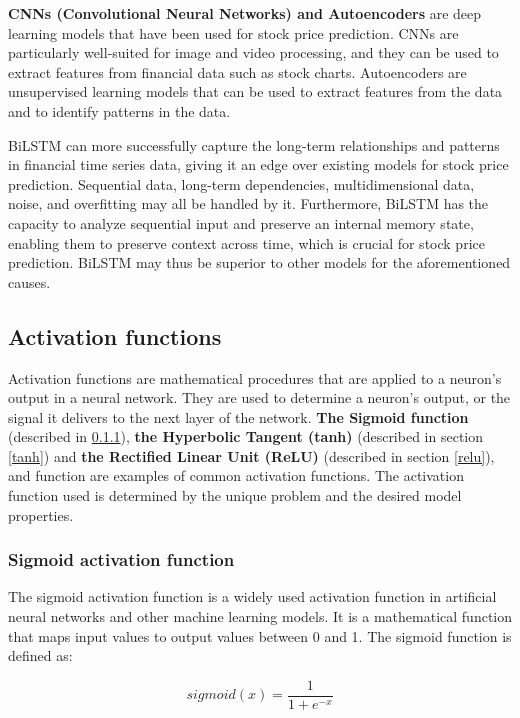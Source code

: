 \documentclass[a4paper]{article}
\begin{document}
\textbf{CNNs (Convolutional Neural Networks) and Autoencoders} are deep learning models that have been used for stock price prediction. CNNs are particularly well-suited for image and video processing, and they can be used to extract features from financial data such as stock charts. Autoencoders are unsupervised learning models that can be used to extract features from the data and to identify patterns in the data.

BiLSTM can more successfully capture the long-term relationships and patterns in financial time series data, giving it an edge over existing models for stock price prediction. Sequential data, long-term dependencies, multidimensional data, noise, and overfitting may all be handled by it. Furthermore, BiLSTM has the capacity to analyze sequential input and preserve an internal memory state, enabling them to preserve context across time, which is crucial for stock price prediction. BiLSTM may thus be superior to other models for the aforementioned causes.
\subsection{Activation functions}

Activation functions are mathematical procedures that are applied to a neuron's output in a neural network. They are used to determine a neuron's output, or the signal it delivers to the next layer of the network. \textbf{The Sigmoid function} (described in \ref{sigmoid}), \textbf{the Hyperbolic Tangent (tanh)} (described in section \ref{tanh}) and\textbf{ the Rectified Linear Unit (ReLU)} (described in section \ref{relu}), and  function are examples of common activation functions. The activation function used is determined by the unique problem and the desired model properties.
\subsubsection{Sigmoid activation function} \label{sigmoid}

The sigmoid activation function is a widely used activation function in artificial neural networks and other machine learning models. It is a mathematical function that maps input values to output values between 0 and 1. The sigmoid function is defined as:

$$
sigmoid(x) = \frac{1}{1+e^{-x}}
$$
\end{document}
